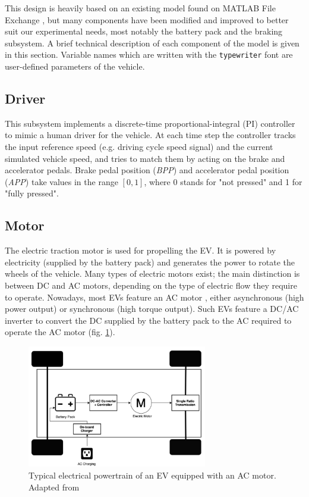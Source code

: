 This design is heavily based on an existing model found on MATLAB File Exchange \cite{racing_lounge}, but many components have been modified and improved to better suit our experimental needs, most notably the battery pack and the braking subsystem. A brief technical description of each component of the model is given in this section. Variable names which are written with the \texttt{typewriter} font are user-defined parameters of the vehicle.



\subsection{Driver}
\label{sec:driver}
This subsystem implements a discrete-time proportional-integral (PI) controller to mimic a human driver for the vehicle. At each time step the controller tracks the input reference speed (e.g. driving cycle speed signal) and the current simulated vehicle speed, and tries to match them by acting on the brake and accelerator pedals. Brake pedal position (\textit{BPP}) and accelerator pedal position (\textit{APP}) take values in the range $[0,1]$, where 0 stands for "not pressed" and 1 for "fully pressed".



\subsection{Motor}
\label{sec:motor}
The electric traction motor is used for propelling the EV. It is powered by electricity (supplied by the battery pack) and generates the power to rotate the wheels of the vehicle. Many types of electric motors exist; the main distinction is between DC and AC motors, depending on the type of electric flow they require to operate. Nowadays, most EVs feature an AC motor \cite{renault_motors}, either asynchronous (high power output) or synchronous (high torque output). Such EVs feature a DC/AC inverter to convert the DC supplied by the battery pack to the AC required to operate the AC motor (fig. \ref{fig:ev_powertrain}).
\begin{figure}[htb]
    \centering
    \includegraphics[width=0.7\textwidth]{images/ev_powertrain}
    \caption[Electrical powertrain of an EV]{Typical electrical powertrain of an EV equipped with an AC motor. Adapted from \cite{ev_reporter_powertrain}}
    \label{fig:ev_powertrain}
\end{figure}

